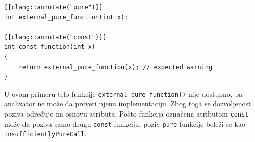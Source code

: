 \documentclass[a4paper,12pt]{article}
\begin{document}
\begin{lstlisting}[caption={Poziv funkcije koja je označena kao pure ali joj je nedostupno telo},label={lst:call-pure}]
[[clang::annotate("pure")]]
int external_pure_function(int x);

[[clang::annotate("const")]]
int const_function(int x)
{
    return external_pure_function(x); // expected warning
}
\end{lstlisting}

U ovom primeru telo funkcije \texttt{external\_pure\_function()} nije dostupno, pa analizator ne može da proveri njenu implementaciju. Zbog toga se dozvoljenost poziva određuje na osnovu atributa. Pošto funkcija označena atributom \texttt{const} može da poziva samo drugu \texttt{const} funkciju, poziv \texttt{pure} funkcije beleži se kao \texttt{InsufficientlyPureCall}.




\end{document}

